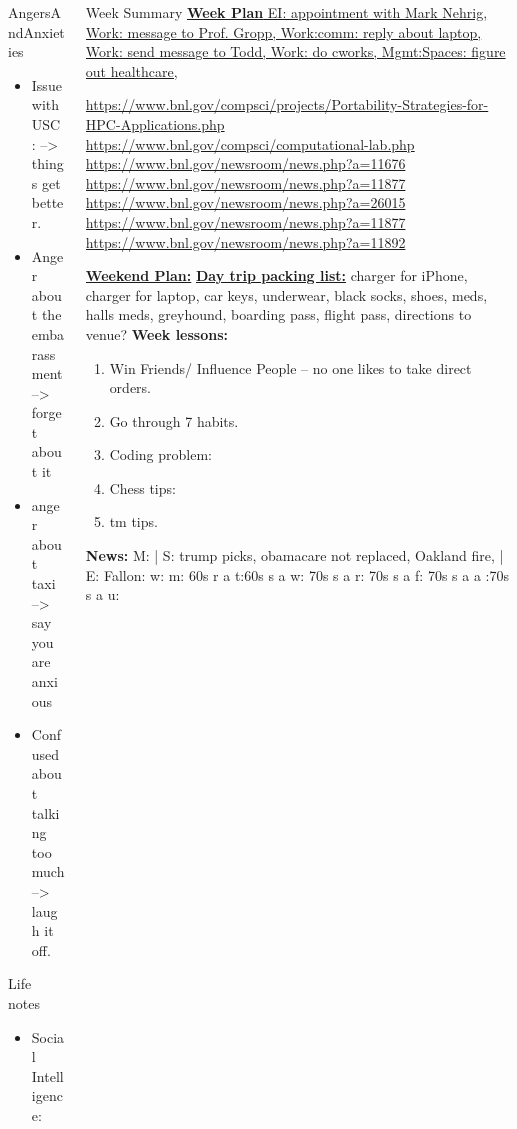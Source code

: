 \documentclass[serif, mathserif, final]{beamer}
\begin{document}
\begin{frame}
\begin{columns}
\begin{column}{0.25\linewidth}
\begin{block}{AngersAndAnxieties}
\begin{itemize}
        \item \tiny Issue with USC : --> things get better. 

        \item \tiny Anger about the embarassment --> forget about it 
\item \tiny anger about taxi --> say you are anxious 
          \item \tiny  Confused about talking too much --> laugh it
            off.  
        \end{itemize}
      \end{block}
      \begin{block}{Life notes}
        \begin{itemize}
          \tiny \item \tiny Social Intelligence: 
        \end{itemize}
      \end{block}
    \end{column}



\begin{column}{0.5\linewidth} 
  \begin{block}{Week Summary} 
    {\tiny \underline{\textbf{Week Plan} 
      EI: appointment with Mark
      Nehrig, Work: message to Prof. Gropp, Work:comm: reply about laptop,
      Work: send message to Todd,
      Work: do cworks,
      Mgmt:Spaces: figure out healthcare,}
    }

\url{https://www.bnl.gov/compsci/projects/Portability-Strategies-for-HPC-Applications.php} 
\url{https://www.bnl.gov/compsci/computational-lab.php}
\url{https://www.bnl.gov/newsroom/news.php?a=11676} 
\url{https://www.bnl.gov/newsroom/news.php?a=11877}
\url{https://www.bnl.gov/newsroom/news.php?a=26015} 
\url{ https://www.bnl.gov/newsroom/news.php?a=11877} 
\url{https://www.bnl.gov/newsroom/news.php?a=11892} 

    {\tiny \underline{\textbf{Weekend Plan:}}}
    {\underline{\bf Day trip packing list:} charger for iPhone,
      charger for laptop, car keys, underwear, black socks, shoes, meds, halls
      meds, greyhound, boarding pass, flight pass, directions to
      venue?}
    {\tiny {\bf Week lessons:}}
    \begin{enumerate}
      \tiny \item \tiny Win Friends/ Influence People – no one
      likes to take direct orders.
    \item \tiny Go through 7 habits.
    \item \tiny Coding problem: 
    \item \tiny Chess tips: 
    \item \tiny tm tips.
    \end{enumerate}
        {{\tiny \bf News:} M: | S: trump picks, obamacare not replaced, Oakland fire, | E: Fallon:  w: {m: {60s r a}}  t:{60s s a}
          {w: {70s s a}} {r: {70s s a}} {f: {70s s a   } } {a :{70s s a} }  {u: {  }  } }
  \end{block}
  

\end{column}
\end{columns}
\end{frame}
\end{document}
